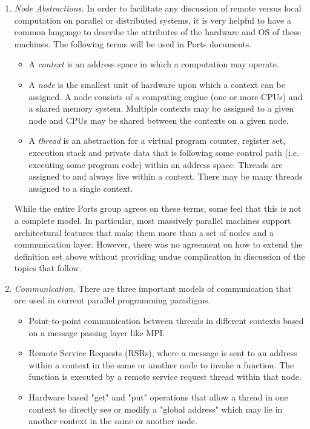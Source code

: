 \begin{enumerate}
\item
{\em Node Abstractions.} In order to facilitate any discussion
of remote versus local computation on parallel or distributed
systems, it is very helpful to have a common language to describe
the attributes of the hardware and OS of these machines.
The following terms will be used in Ports documents.
\begin{itemize} 
\item A {\em context} is an address space in which a computation
may operate. 
\item A {\em node} is the smallest unit of hardware upon which a context can
be assigned. A node consists of a computing engine (one or more CPUs)
and a shared memory system.  Multiple contexts may be assigned
to a given node and CPUs may be shared between the contexts on a given
node.
\item A {\em thread} is an abstraction for a virtual program counter,
register set, execution stack and private data that is following some
control path (i.e. executing some program code) within an address space.
Threads are assigned to and always live within a context.  There
may be many threads assigned to a single context.
\end{itemize}
While the entire Ports group agrees on these terms, some feel that
this is not a complete model.  In particular, most massively parallel
machines support architectural features that make them more than
a set of nodes and a communication layer.  However, there was no
agreement on how to extend the definition set above without providing
undue complication in discussion of the topics that follow.

\item
{\em Communication.}  There are three important models of communication
that are used in current parallel programming paradigms.

\begin{itemize}

   \item Point-to-point communication between threads 
   in different contexts based on
   a message passing layer like MPI.

   \item Remote Service Requests (RSRs), where a message is sent to
   an address within a context in the same or another node  
    to invoke a function. The function is executed by a remote
   service request thread within that node.
   

   \item Hardware based "get" and "put" operations that allow
   a thread in one context to directly see or modify a "global address"
   which may lie in another context in the same or another node.


\end{itemize}
\end{enumerate}
